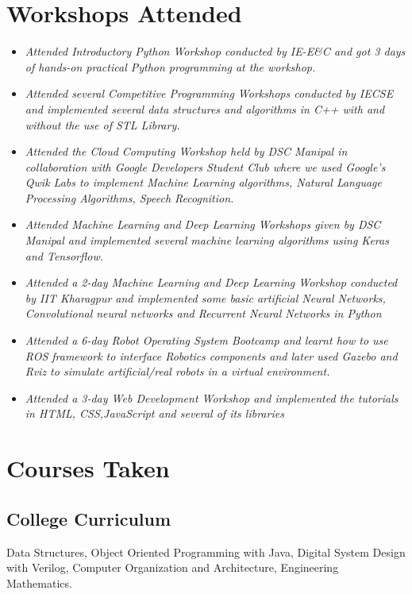 \documentclass[a4paper,12pt]{article}
\begin{document}
\section*{Workshops Attended}
\begin{itemize}
    \item{\textit{Attended Introductory Python Workshop conducted by IE-E\&C
    and got 3 days of hands-on practical Python programming at
    the workshop.}}
    \item{\textit{Attended several Competitive Programming Workshops
    conducted by IECSE and implemented several data structures
    and algorithms in C++ with and without the use of STL Library.}}
    \item{\textit{Attended the Cloud Computing Workshop held by DSC
    Manipal in collaboration with Google Developers Student Club
    where we used Google’s Qwik Labs to implement Machine
    Learning algorithms, Natural Language Processing Algorithms,
    Speech Recognition.}}
    \item{\textit{Attended Machine Learning and Deep Learning Workshops
    given by DSC Manipal and implemented several machine
    learning algorithms using Keras and Tensorflow. }}
    \item{\textit{Attended a 2-day Machine Learning and Deep Learning Workshop 
    conducted by IIT Kharagpur and implemented some basic artificial Neural Networks,
    Convolutional neural networks and Recurrent Neural Networks in Python }}
    \item{\textit{Attended a 6-day Robot Operating System Bootcamp and
    learnt how to use ROS framework to interface Robotics
    components and later used Gazebo and Rviz to simulate
    artificial/real robots in a virtual environment.}}
    \item{\textit{Attended a 3-day Web Development Workshop and implemented 
    the tutorials in HTML, CSS,JavaScript and several of its libraries}}
\end{itemize}

\pagebreak
\section*{Courses Taken}
    \subsection*{College Curriculum}
    Data Structures,
    Object Oriented Programming with Java,
    Digital System Design with Verilog,
    Computer Organization and Architecture,
    Engineering Mathematics. 
\end{document}
